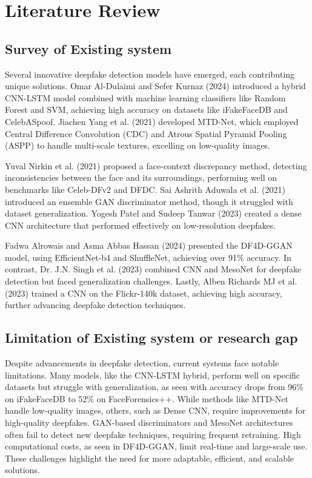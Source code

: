 \chapter{Literature Review}

\section{Survey of Existing system} 
Several innovative deepfake detection models have emerged, each contributing unique solutions. Omar Al-Dulaimi and Sefer Kurnaz (2024) introduced a hybrid CNN-LSTM model combined with machine learning classifiers like Random Forest and SVM, achieving high accuracy on datasets like iFakeFaceDB and CelebASpoof. Jiachen Yang et al. (2021) developed MTD-Net, which employed Central Difference Convolution (CDC) and Atrous Spatial Pyramid Pooling (ASPP) to handle multi-scale textures, excelling on low-quality images.

\noindent Yuval Nirkin et al. (2021) proposed a face-context discrepancy method, detecting inconsistencies between the face and its surroundings, performing well on benchmarks like Celeb-DFv2 and DFDC. Sai Ashrith Aduwala et al. (2021) introduced an ensemble GAN discriminator method, though it struggled with dataset generalization. Yogesh Patel and Sudeep Tanwar (2023) created a dense CNN architecture that performed effectively on low-resolution deepfakes.

\noindent Fadwa Alrowais and Asma Abbas Hassan (2024) presented the DF4D-GGAN model, using EfficientNet-b4 and ShuffleNet, achieving over 91\% accuracy. In contrast, Dr. J.N. Singh et al. (2023) combined CNN and MesoNet for deepfake detection but faced generalization challenges. Lastly, Alben Richards MJ et al. (2023) trained a CNN on the Flickr-140k dataset, achieving high accuracy, further advancing deepfake detection techniques.

\section{Limitation of Existing system or research gap }
Despite advancements in deepfake detection, current systems face notable limitations. Many models, like the CNN-LSTM hybrid, perform well on specific datasets but struggle with generalization, as seen with accuracy drops from 96\% on iFakeFaceDB to 52\% on FaceForensics++. While methods like MTD-Net handle low-quality images, others, such as Dense CNN, require improvements for high-quality deepfakes. GAN-based discriminators and MesoNet architectures often fail to detect new deepfake techniques, requiring frequent retraining. High computational costs, as seen in DF4D-GGAN, limit real-time and large-scale use. These challenges highlight the need for more adaptable, efficient, and scalable solutions.

